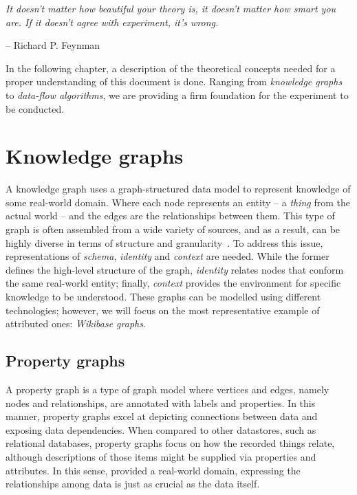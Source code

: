 \epigraph{\textit{It doesn't matter how beautiful your theory is, it doesn't matter how smart you are. If it doesn't agree with experiment, it's wrong.}}{-- \textup{Richard P. Feynman }}

In the following chapter, a description of the theoretical concepts needed for a proper understanding of this document is done. Ranging from \textit{knowledge graphs} to \textit{data-flow algorithms}, we are providing a firm foundation for the experiment to be conducted.

\section{Knowledge graphs}
\label{section:knowledgeGraph}

A knowledge graph uses a graph-structured data model to represent knowledge of some real-world domain. Where each node represents an entity -- a \textit{thing} from the actual world -- and the edges are the relationships between them. This type of graph is often assembled from a wide variety of sources, and as a result, can be highly diverse in terms of structure and granularity~\cite{DBLP:journals/corr/abs-2003-02320}. To address this issue, representations of \textit{schema}, \textit{identity} and \textit{context} are needed. While the former defines the high-level structure of the graph, \textit{identity} relates nodes that conform the same real-world entity; finally, \textit{context} provides the environment for specific knowledge to be understood. These graphs can be modelled using different technologies; however, we will focus on the most representative example of attributed ones: \textit{Wikibase graphs}.

\subsection{Property graphs}

A property graph is a type of graph model where vertices and edges, namely nodes and relationships, are annotated with labels and properties. In this manner, property graphs excel at depicting connections between data and exposing data dependencies. When compared to other datastores, such as relational databases, property graphs focus on how the recorded things relate, although descriptions of those items might be supplied via properties and attributes. In this sense, provided a real-world domain, expressing the relationships among data is just as crucial as the data itself.


